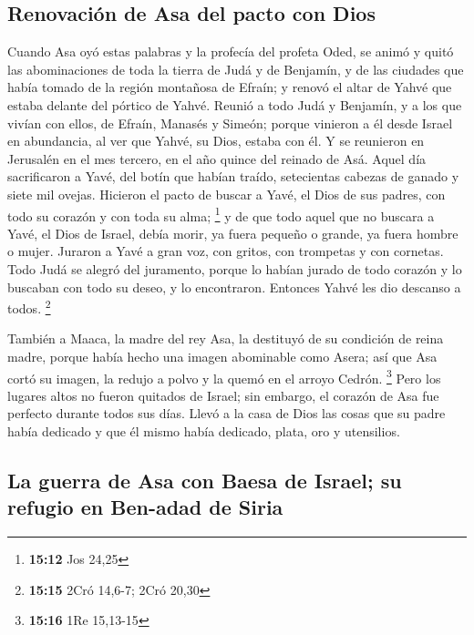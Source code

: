 \begin{paracol}{2}
{\subsection{Renovación de Asa del pacto con
Dios}\label{renovaciuxf3n-de-asa-del-pacto-con-dios}}

 Cuando Asa oyó estas palabras y la profecía del profeta
Oded, se animó y quitó las abominaciones de toda la tierra de Judá y de
Benjamín, y de las ciudades que había tomado de la región montañosa de
Efraín; y renovó el altar de Yahvé que estaba delante del pórtico de
Yahvé.  Reunió a todo Judá y Benjamín, y a los que vivían
con ellos, de Efraín, Manasés y Simeón; porque vinieron a él desde
Israel en abundancia, al ver que Yahvé, su Dios, estaba con él.
 Y se reunieron en Jerusalén en el mes tercero, en el año
quince del reinado de Asá.  Aquel día sacrificaron a
Yavé, del botín que habían traído, setecientas cabezas de ganado y siete
mil ovejas.  Hicieron el pacto de buscar a Yavé, el Dios
de sus padres, con todo su corazón y con toda su alma; \footnote{\textbf{15:12}
  Jos 24,25}  y de que todo aquel que no buscara a Yavé,
el Dios de Israel, debía morir, ya fuera pequeño o grande, ya fuera
hombre o mujer.  Juraron a Yavé a gran voz, con gritos,
con trompetas y con cornetas.  Todo Judá se alegró del
juramento, porque lo habían jurado de todo corazón y lo buscaban con
todo su deseo, y lo encontraron. Entonces Yahvé les dio descanso a
todos. \footnote{\textbf{15:15} 2Cró 14,6-7; 2Cró 20,30}

 También a Maaca, la madre del rey Asa, la destituyó de
su condición de reina madre, porque había hecho una imagen abominable
como Asera; así que Asa cortó su imagen, la redujo a polvo y la quemó en
el arroyo Cedrón. \footnote{\textbf{15:16} 1Re 15,13-15} 
Pero los lugares altos no fueron quitados de Israel; sin embargo, el
corazón de Asa fue perfecto durante todos sus días. 
Llevó a la casa de Dios las cosas que su padre había dedicado y que él
mismo había dedicado, plata, oro y utensilios.

\hypertarget{la-guerra-de-asa-con-baesa-de-israel-su-refugio-en-ben-adad-de-siria}{%
\subsection{La guerra de Asa con Baesa de Israel; su refugio en Ben-adad
de
Siria}\label{la-guerra-de-asa-con-baesa-de-israel-su-refugio-en-ben-adad-de-siria}}


\end{paracol}
